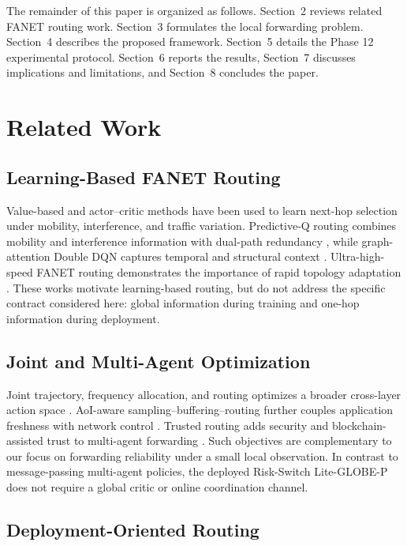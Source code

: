 \documentclass[drones,article,submit,moreauthors]{Definitions/mdpi}
\newcommand{\method}{Risk-Switch Lite-GLOBE-P}
\begin{document}
The remainder of this paper is organized as follows. Section~2 reviews related FANET routing work. Section~3 formulates the local forwarding problem. Section~4 describes the proposed framework. Section~5 details the Phase 12 experimental protocol. Section~6 reports the results, Section~7 discusses implications and limitations, and Section~8 concludes the paper.

\section{Related Work}

\subsection{Learning-Based FANET Routing}

Value-based and actor--critic methods have been used to learn next-hop selection under mobility, interference, and traffic variation. Predictive-Q routing combines mobility and interference information with dual-path redundancy \cite{Dong2026Predictive}, while graph-attention Double DQN captures temporal and structural context \cite{Zhang2025Spatiotemporal}. Ultra-high-speed FANET routing demonstrates the importance of rapid topology adaptation \cite{Shou2026Adaptive}. These works motivate learning-based routing, but do not address the specific contract considered here: global information during training and one-hop information during deployment.

\subsection{Joint and Multi-Agent Optimization}

Joint trajectory, frequency allocation, and routing optimizes a broader cross-layer action space \cite{Alam2024JTFR}. AoI-aware sampling--buffering--routing further couples application freshness with network control \cite{Wu2026AoI}. Trusted routing adds security and blockchain-assisted trust to multi-agent forwarding \cite{Jia2025Trusted}. Such objectives are complementary to our focus on forwarding reliability under a small local observation. In contrast to message-passing multi-agent policies, the deployed \method{} does not require a global critic or online coordination channel.

\subsection{Deployment-Oriented Routing}
\end{document}
